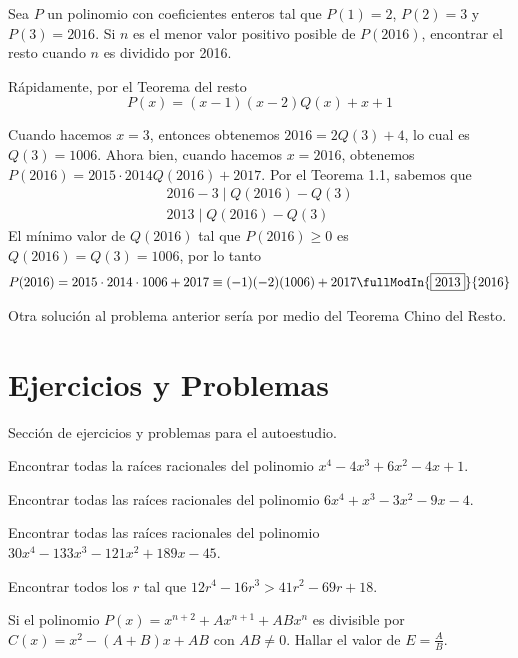 \begin{example}
    Sea $P$ un polinomio con coeficientes enteros tal que $P(1) = 2$, $P(2) = 3$ y $P(3) = 2016$.
    Si $n$ es el menor valor positivo posible de $P(2016)$, encontrar el resto cuando $n$ es dividido por 2016.

    \begin{solution}
        Rápidamente, por el Teorema del resto
        \[P(x) = (x - 1)(x - 2)Q(x) + x + 1\]

        Cuando hacemos $x = 3$, entonces obtenemos $2016 = 2Q(3) + 4$, lo cual es $Q(3) = 1006$.
        Ahora bien, cuando hacemos $x = 2016$, obtenemos $P(2016) = 2015\cdot2014Q(2016) + 2017$.
        Por el Teorema 1.1, sabemos que
        \begin{gather*}
            2016 - 3 \mid Q(2016) - Q(3)\\
            2013 \mid Q(2016) - Q(3)
        \end{gather*}
        El mínimo valor de $Q(2016)$ tal que $P(2016) \geq 0$ es $Q(2016) = Q(3) = 1006$, por lo tanto
        \begin{gather*}
            P(2016) = 2015\cdot2014\cdot1006 + 2017 \equiv (-1)(-2)(1006) + 2017 \fullModIn{\boxed{2013}}{2016}
        \end{gather*}
    \end{solution}
\end{example}

\vspace{-2mm}
Otra solución al problema anterior sería por medio del Teorema Chino del Resto.


\section{Ejercicios y Problemas}
{
    Sección de ejercicios y problemas para el autoestudio.

    \begin{section-problem}
        Encontrar todas la raíces racionales del polinomio $x^4 - 4x^3 + 6x^2 - 4x + 1$.
    \end{section-problem}

    \begin{section-problem}
        Encontrar todas las raíces racionales del polinomio $6x^4 + x^3 - 3x^2 - 9x - 4$.
    \end{section-problem}

    \begin{section-problem}
        Encontrar todas las raíces racionales del polinomio $30x^4 - 133 x^3 - 121x^2 + 189x - 45$.
    \end{section-problem}

    \begin{section-problem}
        Encontrar todos los $r$ tal que $12r^4 - 16r^3 > 41r^2 - 69r + 18$.
    \end{section-problem}

    \begin{section-problem}
        Si el polinomio $P(x) = x^{n + 2} + Ax^{n + 1} + ABx^n$ es divisible por $C(x) = x^2 - (A + B)x + AB$ con $AB \neq 0$.
        Hallar el valor de $E = \frac{A}{B}$.
    \end{section-problem}
}